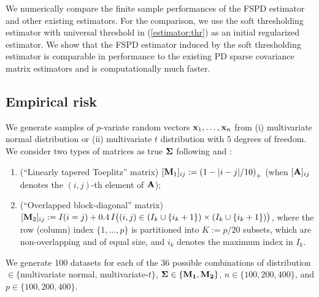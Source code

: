 \documentclass[times,sort&compress,3p]{elsarticle}
\newcommand{\BNUM}{\begin{enumerate}}
\newcommand{\ENUM}{\end{enumerate}}
\begin{document}
We numerically compare the finite sample performances of the
FSPD estimator and other existing estimators. For the comparison, we
use the soft thresholding estimator with universal threshold in (\ref{estimator:thr}) as
an initial regularized estimator. We show that the FSPD estimator induced by the soft thresholding
 estimator is comparable in performance to the existing PD sparse covariance matrix estimators
 and is computationally much faster.
 

 
 

\subsection{Empirical risk}\label{subsec:emperrcomp}

We generate samples of $p$-variate random vectors
${\bf x}_1, \ldots, {\bf x}_n$ from (i) multivariate normal distribution or (ii) multivariate $t$ distribution
 with $5$
degrees of freedom. 
We consider two types of matrices as true ${\bf \Sigma}$ following \citet{Rothman2012} and \citet{Xue2012}:

\BNUM
\item (``Linearly tapered Toeplitz'' matrix) $[{\bf M}_1]_{ij} := \left( 1 - |i-j|/10 \right)_+$ (when $[{\bf A}]_{ij}$ denotes
the $(i,j)$-th element of $\bf A$);
\item (``Overlapped block-diagonal'' matrix) $[{\bf M}_2]_{ij} := I(i = j) +  0.4 \, I \big( (i,j) \in (I_k \cup \{i_k + 1\}) \times (I_k \cup \{i_k + 1\}) \big)$, where the row (column) index $\{1, \ldots, p\}$ is partitioned into $K := p/20$ subsets, which are non-overlapping and of equal size, and $i_k$ denotes the maximum index in $I_k$.
\ENUM
We generate 100 datasets for each of the 36 possible combinations of distribution $\in \{$multivariate
normal, multivariate-$t\}$, $\bf \Sigma \in \{{\bf M}_1, {\bf M}_2\}$, $n \in \{100,200,400\}$, and $p \in \{100,200,400\}$.
\end{document}
